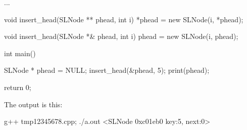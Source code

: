 \begin{console}[frame=single, , commandchars=~!@]
...

void insert_head(SLNode ** phead, int i)
{
    *phead = new SLNode(i, *phead);
}

void insert_head(SLNode *& phead, int i)
{
    phead = new SLNode(i, phead);
}

int main()
{
    SLNode * phead = NULL;
    insert_head(&phead, 5);
    print(phead);
    
    return 0;
}
\end{console}

The output is this:
\begin{console} g++ tmp12345678.cpp; ./a.out
<SLNode 0xc01eb0 key:5, next:0>
\end{console}


